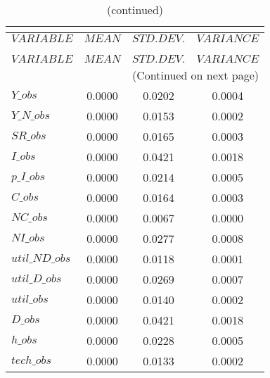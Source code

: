  
\begin{center}
\begin{longtable}{lccc} 
\caption{THEORETICAL MOMENTS}\\
 \label{Table:th_moments}\\
\toprule 
$VARIABLE       $	 & 	 $         MEAN$	 & 	 $    STD. DEV.$	 & 	 $     VARIANCE$\\
\midrule \endfirsthead 
\caption{(continued)}\\
 \toprule \\ 
$VARIABLE       $	 & 	 $         MEAN$	 & 	 $    STD. DEV.$	 & 	 $     VARIANCE$\\
\midrule \endhead 
\midrule \multicolumn{4}{r}{(Continued on next page)} \\ \bottomrule \endfoot 
\bottomrule \endlastfoot 
$Y\_obs         $	 & 	       0.0000	 & 	       0.0202	 & 	       0.0004 \\ 
$Y\_N\_obs      $	 & 	       0.0000	 & 	       0.0153	 & 	       0.0002 \\ 
$SR\_obs        $	 & 	       0.0000	 & 	       0.0165	 & 	       0.0003 \\ 
$I\_obs         $	 & 	       0.0000	 & 	       0.0421	 & 	       0.0018 \\ 
$p\_I\_obs      $	 & 	       0.0000	 & 	       0.0214	 & 	       0.0005 \\ 
$C\_obs         $	 & 	       0.0000	 & 	       0.0164	 & 	       0.0003 \\ 
$NC\_obs        $	 & 	       0.0000	 & 	       0.0067	 & 	       0.0000 \\ 
$NI\_obs        $	 & 	       0.0000	 & 	       0.0277	 & 	       0.0008 \\ 
$util\_ND\_obs  $	 & 	       0.0000	 & 	       0.0118	 & 	       0.0001 \\ 
$util\_D\_obs   $	 & 	       0.0000	 & 	       0.0269	 & 	       0.0007 \\ 
$util\_obs      $	 & 	       0.0000	 & 	       0.0140	 & 	       0.0002 \\ 
$D\_obs         $	 & 	       0.0000	 & 	       0.0421	 & 	       0.0018 \\ 
$h\_obs         $	 & 	       0.0000	 & 	       0.0228	 & 	       0.0005 \\ 
$tech\_obs      $	 & 	       0.0000	 & 	       0.0133	 & 	       0.0002 \\ 
\end{longtable}
 \end{center}
